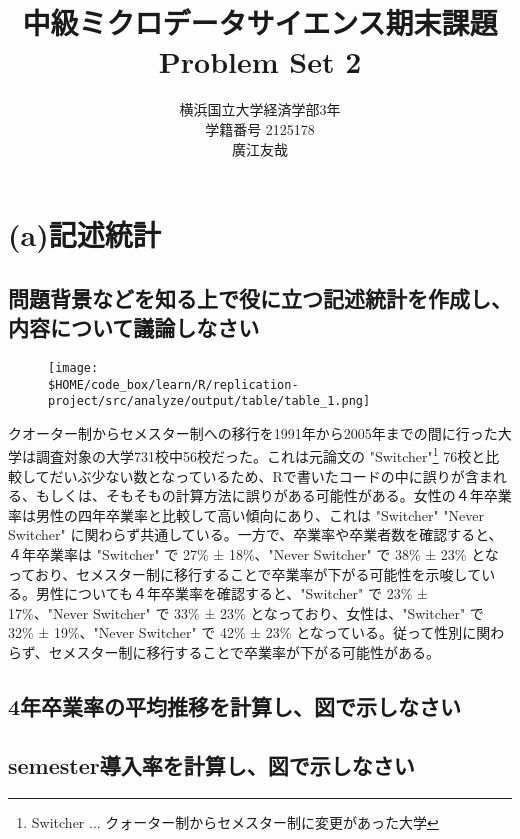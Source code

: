 \documentclass[a4paper]{jsarticle}
\title{中級ミクロデータサイエンス期末課題\\Problem Set 2}
\author{横浜国立大学経済学部3年\\学籍番号 2125178\\廣江友哉}
\begin{document}
\maketitle

\section*{(a)記述統計}

\subsection*{問題背景などを知る上で役に立つ記述統計を作成し、内容について議論しなさい}
\begin{figure}[h]
  \centering
  \texttt{[image: \\\$HOME/code\_box/learn/R/replication-project/src/analyze/output/table/table\_1.png]}

\end{figure}

クオーター制からセメスター制への移行を1991年から2005年までの間に行った大学は調査対象の大学731校中56校だった。これは元論文の "Switcher"\footnote{Switcher ... クォーター制からセメスター制に変更があった大学} 76校と比較してだいぶ少ない数となっているため、Rで書いたコードの中に誤りが含まれる、もしくは、そもそもの計算方法に誤りがある可能性がある。女性の４年卒業率は男性の四年卒業率と比較して高い傾向にあり、これは "Switcher" "Never Switcher" に関わらず共通している。一方で、卒業率や卒業者数を確認すると、４年卒業率は "Switcher" で 27\% ± 18\%、"Never Switcher" で 38\% ± 23\% となっており、セメスター制に移行することで卒業率が下がる可能性を示唆している。男性についても４年卒業率を確認すると、"Switcher" で 23\% ± 17\%、"Never Switcher" で 33\% ± 23\% となっており、女性は、"Switcher" で 32\% ± 19\%、"Never Switcher" で 42\% ± 23\% となっている。従って性別に関わらず、セメスター制に移行することで卒業率が下がる可能性がある。

\subsection*{4年卒業率の平均推移を計算し、図で示しなさい}

\subsection{semester導入率を計算し、図で示しなさい}
\end{document}
